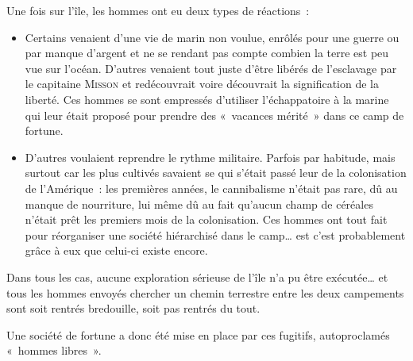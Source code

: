 {	Une fois sur l’île, les hommes ont eu deux types de réactions~:
	\begin{itemize}
		\item Certains venaient d’une vie de marin non voulue, enrôlés pour une guerre ou par manque d’argent et ne se rendant pas compte combien la terre est peu vue sur l’océan.  D’autres venaient tout juste d’être libérés de l’esclavage par le capitaine \textsc{Misson} et redécouvrait voire découvrait la signification de la liberté.
			Ces hommes se sont empressés d’utiliser l’échappatoire à la marine qui leur était proposé pour prendre des «~vacances mérité~» dans ce camp de fortune.
		\item D’autres voulaient reprendre le rythme militaire.  Parfois par habitude, mais surtout car les plus cultivés savaient se qui s’était passé leur de la colonisation de l’Amérique~:  les premières années, le cannibalisme n’était pas rare, dû au manque de nourriture, lui même dû au fait qu’aucun champ de céréales n’était prêt les premiers mois de la colonisation.
			Ces hommes ont tout fait pour réorganiser une société hiérarchisé dans le camp… est c’est probablement grâce à eux que celui-ci existe encore.
	\end{itemize}
	Dans tous les cas, aucune exploration sérieuse de l’île n’a pu être exécutée… et tous les hommes envoyés chercher un chemin terrestre entre les deux campements sont soit rentrés bredouille, soit pas rentrés du tout.

	Une société de fortune a donc été mise en place par ces fugitifs, autoproclamés «~hommes libres~».
}

